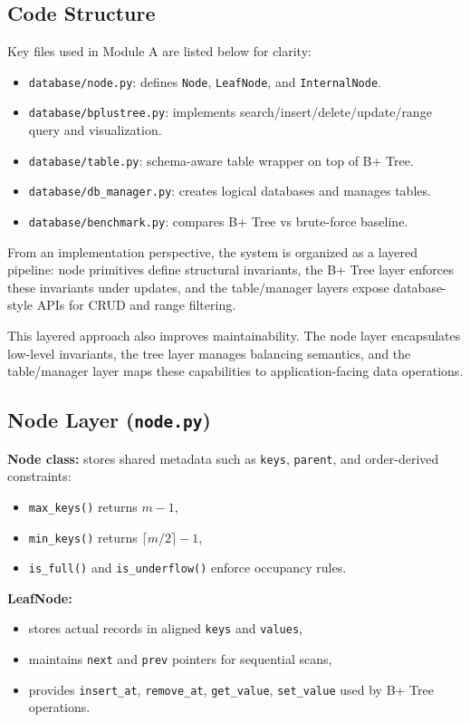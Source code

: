 \documentclass[12pt, a4paper]{article}
\begin{document}
\subsection{Code Structure}
Key files used in Module A are listed below for clarity:
\begin{itemize}
    \item \texttt{database/node.py}: defines \texttt{Node}, \texttt{LeafNode}, and \texttt{InternalNode}.
    \item \texttt{database/bplustree.py}: implements search/insert/delete/update/range query and visualization.
    \item \texttt{database/table.py}: schema-aware table wrapper on top of B+ Tree.
    \item \texttt{database/db\_manager.py}: creates logical databases and manages tables.
    \item \texttt{database/benchmark.py}: compares B+ Tree vs brute-force baseline.
\end{itemize}

From an implementation perspective, the system is organized as a layered pipeline: node primitives define structural invariants, the B+ Tree layer enforces these invariants under updates, and the table/manager layers expose database-style APIs for CRUD and range filtering.

This layered approach also improves maintainability. The node layer encapsulates low-level invariants, the tree layer manages balancing semantics, and the table/manager layer maps these capabilities to application-facing data operations.

\subsection{Node Layer (\texttt{node.py})}
\textbf{Node class:} stores shared metadata such as \texttt{keys}, \texttt{parent}, and order-derived constraints:
\begin{itemize}
    \item \texttt{max\_keys()} returns \(m-1\),
    \item \texttt{min\_keys()} returns \(\lceil m/2 \rceil - 1\),
    \item \texttt{is\_full()} and \texttt{is\_underflow()} enforce occupancy rules.
\end{itemize}

\textbf{LeafNode:}
\begin{itemize}
    \item stores actual records in aligned \texttt{keys} and \texttt{values},
    \item maintains \texttt{next} and \texttt{prev} pointers for sequential scans,
    \item provides \texttt{insert\_at}, \texttt{remove\_at}, \texttt{get\_value}, \texttt{set\_value} used by B+ Tree operations.
\end{itemize}
\end{document}
